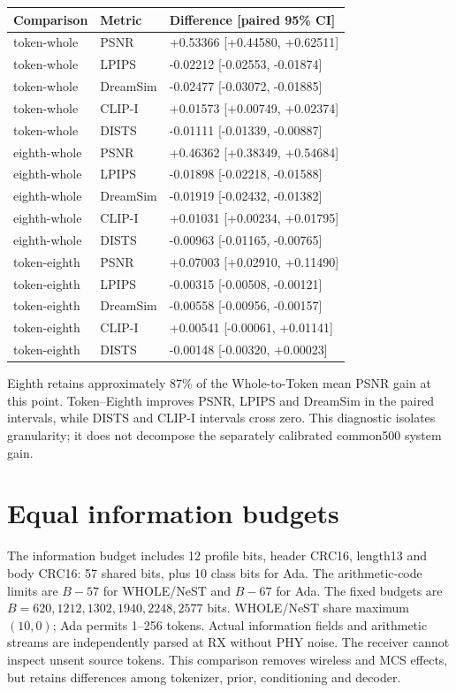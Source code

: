 \documentclass[10pt,letterpaper]{article}
\begin{document}
\begin{longtable}{@{}lll@{}}\toprule
Comparison & Metric & Difference [paired 95\% CI]\\\midrule\endhead
token-whole & PSNR & +0.53366 [+0.44580, +0.62511]\\
token-whole & LPIPS & -0.02212 [-0.02553, -0.01874]\\
token-whole & DreamSim & -0.02477 [-0.03072, -0.01885]\\
token-whole & CLIP-I & +0.01573 [+0.00749, +0.02374]\\
token-whole & DISTS & -0.01111 [-0.01339, -0.00887]\\
eighth-whole & PSNR & +0.46362 [+0.38349, +0.54684]\\
eighth-whole & LPIPS & -0.01898 [-0.02218, -0.01588]\\
eighth-whole & DreamSim & -0.01919 [-0.02432, -0.01382]\\
eighth-whole & CLIP-I & +0.01031 [+0.00234, +0.01795]\\
eighth-whole & DISTS & -0.00963 [-0.01165, -0.00765]\\
token-eighth & PSNR & +0.07003 [+0.02910, +0.11490]\\
token-eighth & LPIPS & -0.00315 [-0.00508, -0.00121]\\
token-eighth & DreamSim & -0.00558 [-0.00956, -0.00157]\\
token-eighth & CLIP-I & +0.00541 [-0.00061, +0.01141]\\
token-eighth & DISTS & -0.00148 [-0.00320, +0.00023]\\
\bottomrule\end{longtable}
Eighth retains approximately 87\% of the Whole-to-Token mean PSNR gain at this point. Token--Eighth improves PSNR, LPIPS and DreamSim in the paired intervals, while DISTS and CLIP-I intervals cross zero. This diagnostic isolates granularity; it does not decompose the separately calibrated common500 system gain.

\section{Equal information budgets}\label{sup:4}
The information budget includes 12 profile bits, header CRC16, length13 and body CRC16: 57 shared bits, plus 10 class bits for Ada. The arithmetic-code limits are $B-57$ for WHOLE/NeST and $B-67$ for Ada. The fixed budgets are $B=620,1212,1302,1940,2248,2577$ bits. WHOLE/NeST share maximum $(10,0)$; Ada permits 1--256 tokens. Actual information fields and arithmetic streams are independently parsed at RX without PHY noise. The receiver cannot inspect unsent source tokens. This comparison removes wireless and MCS effects, but retains differences among tokenizer, prior, conditioning and decoder.
\end{document}
